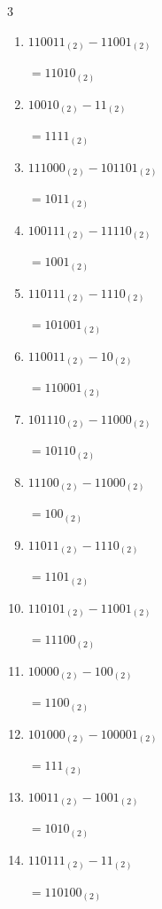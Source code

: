 \begin{multicols}{3}
\begin{enumerate}
        $=11110_{(2)}$

  \item $110011_{(2)} - 11001_{(2)}$

        $=11010_{(2)}$

  \item $10010_{(2)} - 11_{(2)}$

        $=1111_{(2)}$

  \item $111000_{(2)} - 101101_{(2)}$

        $=1011_{(2)}$

  \item $100111_{(2)} - 11110_{(2)}$

        $=1001_{(2)}$

  \item $110111_{(2)} - 1110_{(2)}$

        $=101001_{(2)}$

  \item $110011_{(2)} - 10_{(2)}$

        $=110001_{(2)}$

  \item $101110_{(2)} - 11000_{(2)}$

        $=10110_{(2)}$

  \item $11100_{(2)} - 11000_{(2)}$

        $=100_{(2)}$

\columnbreak %

  \item $11011_{(2)} - 1110_{(2)}$

        $=1101_{(2)}$

  \item $110101_{(2)} - 11001_{(2)}$

        $=11100_{(2)}$

  \item $10000_{(2)} - 100_{(2)}$

        $=1100_{(2)}$

  \item $101000_{(2)} - 100001_{(2)}$

        $=111_{(2)}$

  \item $10011_{(2)} - 1001_{(2)}$

        $=1010_{(2)}$

  \item $110111_{(2)} - 11_{(2)}$

        $=110100_{(2)}$


\end{enumerate}
\end{multicols}
